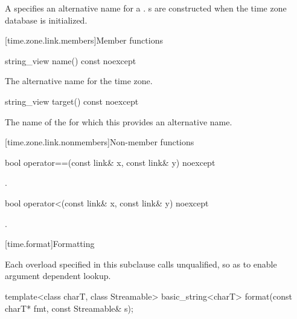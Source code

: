 \pnum
A  specifies an alternative name for a .
s are constructed when the time zone database is initialized.

[time.zone.link.members]{Member functions}

%
\begin{itemdecl}
string_view name() const noexcept
\end{itemdecl}

\begin{itemdescr}
\pnum
\returns
The alternative name for the time zone.
\end{itemdescr}

%
\begin{itemdecl}
string_view target() const noexcept
\end{itemdecl}

\begin{itemdescr}
\pnum
\returns
The name of the  for which
this  provides an alternative name.
\end{itemdescr}

[time.zone.link.nonmembers]{Non-member functions}

%
\begin{itemdecl}
bool operator==(const link& x, const link& y) noexcept
\end{itemdecl}

\begin{itemdescr}
\pnum
\returns {}.
\end{itemdescr}

%
\begin{itemdecl}
bool operator<(const link& x, const link& y) noexcept
\end{itemdecl}

\begin{itemdescr}
\pnum
\returns {}.
\end{itemdescr}

[time.format]{Formatting}

\pnum
Each  overload specified in this subclause
calls  unqualified,
so as to enable argument dependent lookup.

%
\begin{itemdecl}
template<class charT, class Streamable>
  basic_string<charT>
    format(const charT* fmt, const Streamable& s);
\end{itemdecl}

